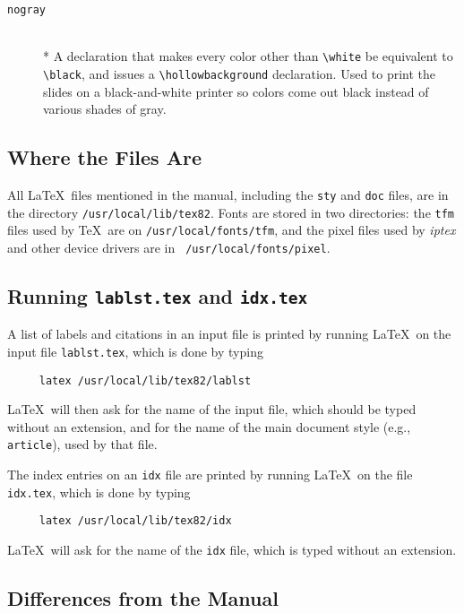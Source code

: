 \begin{description}
\item[{\tt \bs nogray}] \mbox{}\\*
A declaration that makes every color other than
\verb+\white+ be equivalent to \verb+\black+, and issues a
\verb+\hollowbackground+ declaration.  Used to print the slides on a
black-and-white printer so colors come out black instead of various
shades of gray.
\end{description}
 
\subsection{Where the Files Are}
 
%
 
All \LaTeX\ files mentioned in the manual, including the {\tt sty} and
{\tt doc} files, are in the directory \mbox{\tt /usr/local/lib/tex82}.
Fonts are stored in two directories: the {\tt tfm} files used by \TeX\
are on \mbox{\tt /usr/local/fonts/tfm}, and the pixel files used by
{\em iptex\/} and other device drivers are in \mbox{\tt
/usr/local/fonts/pixel}.
 
\subsection{Running {\tt lablst.tex} and {\tt idx.tex}}
 
A list of labels and citations in an input file is printed
by running \LaTeX\ on the input file \mbox{\tt lablst.tex},
which is done by typing
\begin{verbatim}
     latex /usr/local/lib/tex82/lablst
\end{verbatim}
\LaTeX\ will then ask for the name of the input file, which should be
typed without an extension, and for the name of the main document style
(e.g., \mbox{\tt article}), used by that file.
 
The index entries on an {\tt idx} file are printed by running \LaTeX\
on the file \mbox{\tt idx.tex}, which is done by typing
\begin{verbatim}
     latex /usr/local/lib/tex82/idx
\end{verbatim}
\LaTeX\ will ask for the name of the {\tt idx} file, which is typed
without an extension.
 
 
 
\subsection{Differences from the Manual}
 

